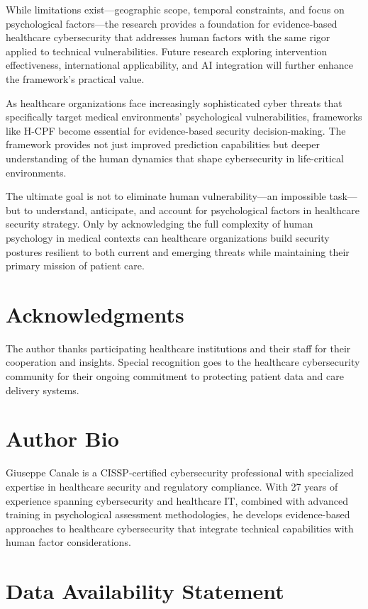 \documentclass[10pt, twocolumn]{article}
\begin{document}
While limitations exist—geographic scope, temporal constraints, and focus on psychological factors—the research provides a foundation for evidence-based healthcare cybersecurity that addresses human factors with the same rigor applied to technical vulnerabilities. Future research exploring intervention effectiveness, international applicability, and AI integration will further enhance the framework's practical value.

As healthcare organizations face increasingly sophisticated cyber threats that specifically target medical environments' psychological vulnerabilities, frameworks like H-CPF become essential for evidence-based security decision-making. The framework provides not just improved prediction capabilities but deeper understanding of the human dynamics that shape cybersecurity in life-critical environments.

The ultimate goal is not to eliminate human vulnerability—an impossible task—but to understand, anticipate, and account for psychological factors in healthcare security strategy. Only by acknowledging the full complexity of human psychology in medical contexts can healthcare organizations build security postures resilient to both current and emerging threats while maintaining their primary mission of patient care.

\section*{Acknowledgments}

The author thanks participating healthcare institutions and their staff for their cooperation and insights. Special recognition goes to the healthcare cybersecurity community for their ongoing commitment to protecting patient data and care delivery systems.

\section*{Author Bio}

Giuseppe Canale is a CISSP-certified cybersecurity professional with specialized expertise in healthcare security and regulatory compliance. With 27 years of experience spanning cybersecurity and healthcare IT, combined with advanced training in psychological assessment methodologies, he develops evidence-based approaches to healthcare cybersecurity that integrate technical capabilities with human factor considerations.

\section*{Data Availability Statement}
\end{document}
